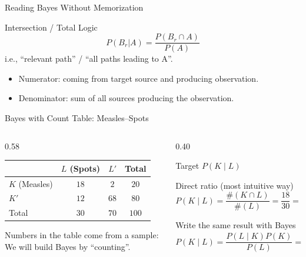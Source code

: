 \documentclass[light]{lutbeamer}
\begin{document}
\begin{frame}{Reading Bayes Without Memorization}
    \begin{block}{Intersection / Total Logic}
        \[
        P(B_r|A)=\frac{P(B_r\cap A)}{P(A)}
        \]
        i.e., ``relevant path'' / ``all paths leading to A''.
    \end{block}

    \begin{itemize}
        \item Numerator: coming from target source and producing observation.
        \item Denominator: sum of all sources producing the observation.
    \end{itemize}
\end{frame}

\begin{frame}{Bayes with Count Table: Measles--Spots}
    \small
    \begin{columns}[T]
        \begin{column}{0.58\textwidth}
            \centering
            \begin{tabular}{lcc|c}
                \toprule
                 & $L$ (Spots) & $L'$ & Total \\
                \midrule
                $K$ (Measles)   & $18$ & $2$  & $20$ \\
                $K'$            & $12$ & $68$ & $80$ \\
                \midrule
                Total          & $30$ & $70$ & $100$ \\
                \bottomrule
            \end{tabular}

            \vspace{0.2cm}
            \footnotesize
            Numbers in the table come from a sample: We will build Bayes by ``counting''.
        \end{column}

        \begin{column}{0.40\textwidth}
            \begin{block}{Target}
                $P(K\mid L)$
            \end{block}

            \begin{alertblock}{Direct ratio (most intuitive way)}
                \[
                P(K\mid L)=\frac{\#(K\cap L)}{\#(L)}=\frac{18}{30}=0.6
                \]
            \end{alertblock}

            \begin{block}{Write the same result with Bayes}
                \[
                P(K\mid L)=\frac{P(L\mid K)P(K)}{P(L)}
                =\frac{\tfrac{18}{20}\cdot\tfrac{20}{100}}{\tfrac{30}{100}}
                =\frac{0.9\times 0.2}{0.3}=0.6\;\checkmark
                \]
            \end{block}
        \end{column}
    \end{columns}
\end{frame}
\end{document}
